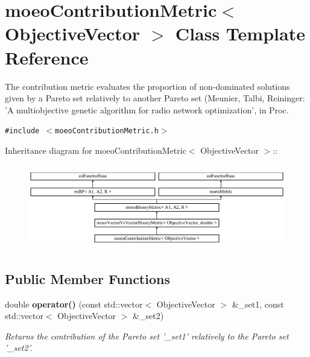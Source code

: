 \section{moeo\-Contribution\-Metric$<$ Objective\-Vector $>$ Class Template Reference}
\label{classmoeoContributionMetric}
The contribution metric evaluates the proportion of non-dominated solutions given by a Pareto set relatively to another Pareto set (Meunier, Talbi, Reininger: 'A multiobjective genetic algorithm for radio network optimization', in Proc.  


{\tt \#include $<$moeo\-Contribution\-Metric.h$>$}

Inheritance diagram for moeo\-Contribution\-Metric$<$ Objective\-Vector $>$::\begin{figure}[H]
\begin{center}
\leavevmode
\includegraphics[height=3.71353cm]{classmoeoContributionMetric}
\end{center}
\end{figure}
\subsection*{Public Member Functions}
\begin{CompactItemize}
\item 
double {\bf operator()} (const std::vector$<$ Objective\-Vector $>$ \&\_\-set1, const std::vector$<$ Objective\-Vector $>$ \&\_\-set2)
\begin{CompactList}\small\item\em Returns the contribution of the Pareto set '\_\-set1' relatively to the Pareto set '\_\-set2'. \item\end{CompactList}\end{CompactItemize}
